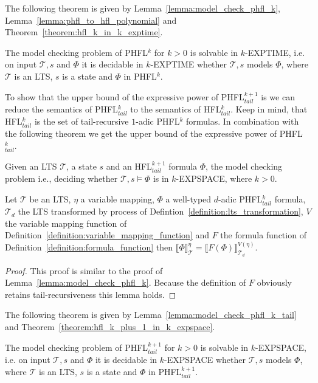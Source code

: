 The following theorem is given by Lemma~\ref{lemma:model_check_phfl_k}, Lemma~\ref{lemma:phfl_to_hfl_polynomial} and Theorem~\ref{theorem:hfl_k_in_k_exptime}.

\begin{theorem}
    \label{theorem:phfl_k_in_k_exptime}
	The model checking problem of PHFL$^k$ for $k > 0$ is solvable in $k$-EXPTIME, i.e. on input $\mathcal{T}, s$ and $\Phi$ it is decidable in $k$-EXPTIME whether $\mathcal{T}, s$ models $\Phi$, where $\mathcal{T}$ is an LTS, $s$ is a state and $\Phi$ in PHFL$^k$.    
\end{theorem}

To show that the upper bound of the expressive power of PHFL$^{k + 1}_{tail}$ is  we can reduce the semantics of
PHFL$^{k}_{tail}$ to the semantics of HFL$^k_{tail}$. Keep in mind, that HFL$^k_{tail}$ is the set of tail-recursive
$1$-adic PHFL$^k$ formulas. In combination with the following theorem we get the upper bound
of the expressive power of PHFL$^k_{tail}$.

\begin{theorem}{\cite{bruse2017space}}
    \label{theorem:hfl_k_plus_1_in_k_expspace}
    Given an LTS $\mathcal{T}$, a state $s$ and an HFL$^{k + 1}_{tail}$ formula $\Phi$, the model checking problem i.e., deciding whether
    $\mathcal{T}, s \models \Phi$ is in $k$-EXPSPACE, where $k > 0$.
\end{theorem}

\begin{lemma}
    \label{lemma:model_check_phfl_k_tail}
    Let $\mathcal{T}$ be an LTS, $\eta$ a variable mapping, $\Phi$ a well-typed $d$-adic
    PHFL$^k_{tail}$ formula, $\mathcal{T}_d$ the LTS transformed by process of
    Defintion~\ref{definition:lts_transformation},
    $V$ the variable mapping function of Definition~\ref{definition:variable_mapping_function}
    and $F$ the formula function of Definition~\ref{definition:formula_function} then $\llbracket \Phi \rrbracket^\eta_\mathcal{T} = \llbracket F(\Phi)
    \rrbracket^{V(\eta)}_{\mathcal{T}_d}$.
\end{lemma}

\begin{proof}
    This proof is similar to the proof of Lemma~\ref{lemma:model_check_phfl_k}. Because the definition of $F$ obviously retains tail-recursiveness this lemma holds.
\end{proof}

The following theorem is given by Lemma~\ref{lemma:model_check_phfl_k_tail} and
Theorem~\ref{theorem:hfl_k_plus_1_in_k_expspace}.

\begin{theorem}
    \label{theorem:phfl_k_plus_1_tail_in_k_expspace}
The model checking problem of PHFL$^{k + 1}_{tail}$ for $k > 0$ is solvable in $k$-EXPSPACE, i.e. on input $\mathcal{T}, s$ and $\Phi$ it is decidable in $k$-EXPSPACE whether $\mathcal{T}, s$ models $\Phi$, where $\mathcal{T}$ is an LTS, $s$ is a state and $\Phi$ in PHFL$^{k + 1}_{tail}$.        
\end{theorem}